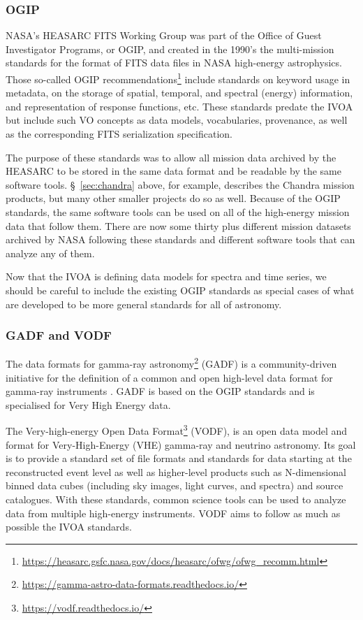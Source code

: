 \documentclass[11pt,a4paper]{ivoa}
\begin{document}
\subsubsection{{OGIP}}\label{sec:ogip}

NASA's HEASARC FITS Working Group was part of the Office of Guest Investigator Programs, or OGIP, and created in the 1990's the multi-mission standards for the format of FITS data files in NASA high-energy astrophysics. Those so-called OGIP  recommendations\footnote{\url{https://heasarc.gsfc.nasa.gov/docs/heasarc/ofwg/ofwg_recomm.html}} include standards on keyword usage in metadata, on the storage of spatial, temporal, and spectral (energy) information, and representation of response functions, etc.  These standards predate the IVOA but include such VO concepts as data models, vocabularies, provenance, as well as the corresponding FITS serialization specification.   

The purpose of these standards was to allow all mission data archived by the HEASARC to be stored in the same data format and be readable by the same software tools. \S~\ref{sec:chandra} above, for example, describes the Chandra mission products, but many other smaller projects do so as well.  Because of the OGIP standards, the same software tools can be used on all of the high-energy mission data that follow them.  There are now some thirty plus different mission datasets archived by NASA following these standards and different software tools that can analyze any of them.  

Now that the IVOA is defining data models for spectra and time series, we should be careful to include the existing OGIP standards as special cases of what are developed to be more general standards for all of astronomy.   


\subsubsection{GADF and VODF}
\label{sec:GADF}

The data formats for gamma-ray astronomy\footnote{\url{https://gamma-astro-data-formats.readthedocs.io/}} (GADF) is a community-driven initiative for the definition of a common and open high-level data format for gamma-ray instruments \citep{2017AIPC.1792g0006D,2021-DF}. GADF is based on the OGIP standards and is specialised for Very High Energy data.

The Very-high-energy Open Data Format\footnote{\url{https://vodf.readthedocs.io/}} (VODF), is an open data model and format for Very-High-Energy (VHE) gamma-ray and neutrino astronomy. Its goal is to provide a standard set of file formats and standards for data starting at the reconstructed event level as well as higher-level products such as N-dimensional binned data cubes (including sky images, light curves, and spectra) and source catalogues. With these standards, common science tools can be used to analyze data from multiple high-energy instruments. VODF aims to follow as much as possible the IVOA standards.
\end{document}
